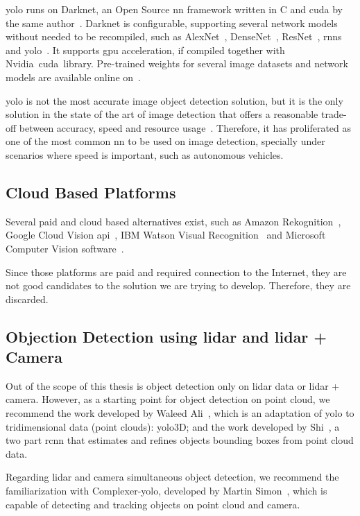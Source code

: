 \ac{yolo} runs on Darknet, an Open Source \ac{nn} framework written in C and \ac{cuda} by the same author~\cite{Redmon2013}. Darknet is configurable, supporting several network models without needed to be recompiled, such as AlexNet~\cite{Krizhevsky2007}, DenseNet~\cite{Huang2017}, ResNet~\cite{He2016}, \acp{rnn}~\cite{Cleeremans1989} and \ac{yolo}~\cite{Redmon2016}. It supports \ac{gpu} acceleration, if compiled together with Nvidia\cp~\ac{cuda}\texttrademark~library. Pre-trained weights for several image datasets and network models are available online on~\cite{Redmon2013}. 

\ac{yolo} is not the most accurate image object detection solution, but it is the only solution in the state of the art of image detection that offers a reasonable trade-off between accuracy, speed and resource usage~\cite{Redmon2018}. Therefore, it has proliferated as one of the most common \ac{nn} to be used on image detection, specially under scenarios where speed is important, such as autonomous vehicles.

\subsection{Cloud Based Platforms}
Several paid and cloud based alternatives exist, such as Amazon Rekognition~\cite{awsRekognition}, Google Cloud Vision \ac{api}~\cite{googlevision}, IBM Watson Visual Recognition~\cite{watson} and Microsoft Computer Vision software~\cite{azurecv}. 

Since those platforms are paid and required connection to the Internet, they are not good candidates to the solution we are trying to develop. Therefore, they are discarded.

\subsection{Objection Detection using \ac{lidar} and \ac{lidar} + Camera}
Out of the scope of this thesis is object detection only on \ac{lidar} data or \ac{lidar} + camera. However, as a starting point for object detection on point cloud, we recommend the work developed by Waleed Ali\etal~\cite{Ali2019}, which is an adaptation of \ac{yolo} to tridimensional data (point clouds): \ac{yolo}3D; and the work developed by Shi\etal~\cite{Shi2018}, a two part \ac{rcnn} that estimates and refines objects bounding boxes from point cloud data.

Regarding \ac{lidar} and camera simultaneous object detection, we recommend the familiarization with Complexer-\ac{yolo}, developed by Martin Simon\etal~\cite{Simon2019}, which is capable of detecting and tracking objects on point cloud and camera.



